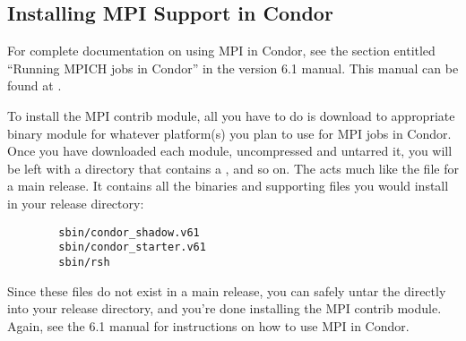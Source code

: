 \subsection{\label{sec:Install-MPI-Condor}
Installing MPI Support in Condor} 


For complete documentation on using MPI in Condor, see the section
entitled ``Running MPICH jobs in Condor'' in the version 6.1 manual.
This manual can be found at
.

To install the MPI contrib module, all you have to do is download
to appropriate binary module for whatever platform(s) you plan to use
for MPI jobs in Condor.
Once you have downloaded each module, uncompressed and untarred it, you
will be left with a directory that contains a ,
 and so on.
The  acts much like the  file for a
main release. 
It contains all the binaries and supporting files you would install in
your release directory:
\begin{verbatim}
        sbin/condor_shadow.v61
        sbin/condor_starter.v61
        sbin/rsh
\end{verbatim}

Since these files do not exist in a main release, you can safely untar
the  directly into your release directory, and you're
done installing the MPI contrib module.
Again, see the 6.1 manual for instructions on how to use MPI in
Condor.

